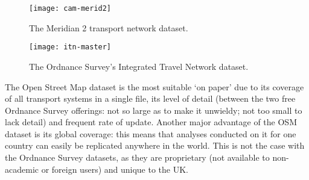 \begin{figure}[h]
 \begin{center}
 \texttt{[image: cam-merid2]}\end{center}
 \caption{The Meridian 2 transport network dataset.}
 \label{fcam-merid2}
\end{figure}

\begin{figure}[h]
 \begin{center}
 \texttt{[image: itn-master]}\end{center}
 \caption{The Ordnance Survey's Integrated Travel Network dataset.}
 \label{fitn-master}
\end{figure}

The Open Street Map dataset is the most suitable `on paper' due to its coverage
of all transport systems in a single file, its level of detail (between the two
free Ordnance Survey offerings: not so large as to make it unwieldy; not too
small to lack detail) and frequent rate of update. Another major advantage of
the OSM dataset is its global coverage: this means that analyses conducted on
it for one country can easily be replicated anywhere in the world. This is not
the case with the Ordnance Survey datasets, as they are proprietary (not
available to non-academic or foreign users) and unique to the UK.


